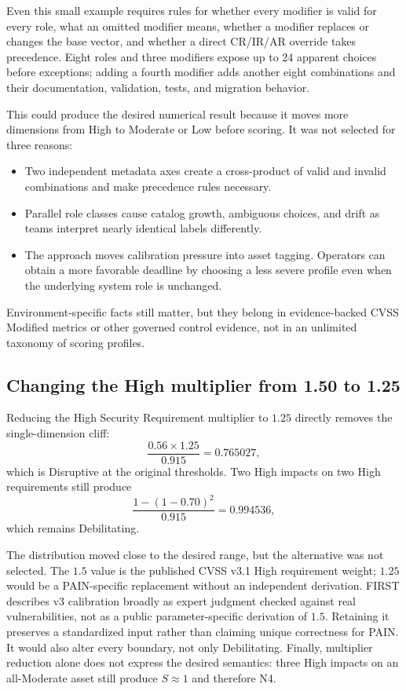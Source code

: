 \documentclass[11pt]{article}
\begin{document}
Even this small example requires rules for whether every modifier is valid for
every role, what an omitted modifier means, whether a modifier replaces or changes
the base vector, and whether a direct CR/IR/AR override takes precedence. Eight
roles and three modifiers expose up to 24 apparent choices before exceptions;
adding a fourth modifier adds another eight combinations and their documentation,
validation, tests, and migration behavior.

This could produce the desired numerical result because it moves more dimensions
from High to Moderate or Low before scoring. It was not selected for three reasons:

\begin{itemize}[leftmargin=1.5em]
\item Two independent metadata axes create a cross-product of valid and invalid
  combinations and make precedence rules necessary.
\item Parallel role classes cause catalog growth, ambiguous choices, and drift as
  teams interpret nearly identical labels differently.
\item The approach moves calibration pressure into asset tagging. Operators can
  obtain a more favorable deadline by choosing a less severe profile even when the
  underlying system role is unchanged.
\end{itemize}

Environment-specific facts still matter, but they belong in evidence-backed CVSS
Modified metrics or other governed control evidence, not in an unlimited taxonomy
of scoring profiles.

\subsection{Changing the High multiplier from 1.50 to 1.25}

Reducing the High Security Requirement multiplier to $1.25$ directly removes the
single-dimension cliff:
\[
\frac{0.56\times1.25}{0.915}=0.765027,
\]
which is Disruptive at the original thresholds. Two High impacts on two High
requirements still produce
\[
\frac{1-(1-0.70)^2}{0.915}=0.994536,
\]
which remains Debilitating.

The distribution moved close to the desired range, but the alternative was not
selected. The $1.5$ value is the published CVSS v3.1 High requirement weight;
$1.25$ would be a PAIN-specific replacement without an independent derivation.
FIRST describes v3 calibration broadly as expert judgment checked against real
vulnerabilities, not as a public parameter-specific derivation of $1.5$. Retaining
it preserves a standardized input rather than claiming unique correctness for PAIN.
It would also alter every boundary, not only Debilitating. Finally, multiplier
reduction alone does not express the desired semantics: three High impacts on an
all-Moderate asset still produce $S\approx1$ and therefore N4.
\end{document}

